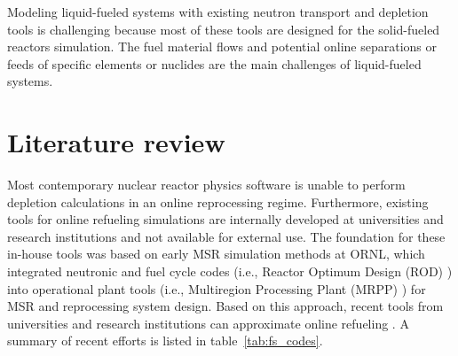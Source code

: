 Modeling liquid-fueled systems with existing neutron transport and 
depletion tools is challenging because most of these tools are 
designed for the solid-fueled reactors simulation. The fuel material 
flows and potential online separations or feeds of specific elements 
or nuclides are the main challenges of liquid-fueled systems. 

\section{Literature review}
Most contemporary nuclear reactor physics software is 
unable to perform depletion calculations in an online 
reprocessing regime. Furthermore, existing tools for 
online refueling simulations are internally developed 
at universities and research institutions and not 
available for external use. The foundation for these in-house
tools was based on early \gls{MSR} simulation methods 
at \gls{ORNL}, which integrated neutronic and fuel 
cycle codes (i.e., Reactor Optimum Design (ROD) 
\cite{bauman_rod_1971}) into operational plant tools 
(i.e., Multiregion Processing Plant (MRPP) 
\cite{kee_mrpp_1976}) for \gls{MSR} and reprocessing 
system design. Based on this approach, recent tools 
from universities and research institutions can
approximate online refueling \cite{serp_molten_2014-1}. 
A summary of recent efforts is listed in table~\ref{tab:fs_codes}.
